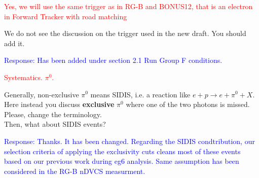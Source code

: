 \begin{itemize}
\textcolor{red}{
 \item Yes, we will use the same trigger as in RG-B and BONUS12, that is an 
    electron in Forward Tracker with road matching  }
 \newline
We do not see the discussion on the trigger used in the new draft. You should 
add it.


  \textcolor{blue}{Response: Has been added under section 2.1 Run Group F 
  conditions.}


  \textcolor{red}{
  \item Systematics. $\pi^0$.  }
  \newline
 
 Generally, non-exclusive $\pi^0$ means SIDIS, i.e. a reaction like 
 $e+p\rightarrow e+\pi^0+X$. Here instead you discuss \textbf{exclusive} 
 $\pi^0$ where one of the two photons is missed. Please, change the 
 terminology. \\ Then, what about SIDIS events?
  
  
  \textcolor{blue}{Response: Thanks. It has been changed. Regarding the SIDIS 
  condtribution, our selection criteria of applying the exclusivity cuts cleans 
  most of these events based on our previous work during eg6 analysis. Same 
  assumption has been considered in the RG-B nDVCS measurment.}
  
 \end{itemize}

